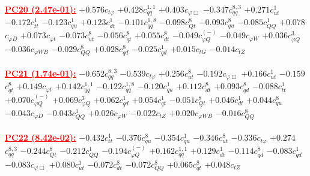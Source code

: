 \documentclass{article}
\begin{document}
\noindent \textcolor{red}{\underline{\bf{PC20} (2.47e-01):}}
{$+0.576$}{\rm $c_{t \varphi}$} 
{$+0.428$}{\rm $c_{qq}^{1,1}$} 
{$+0.403$}{\rm $c_{\varphi \Box}$} 
{$-0.347$}{\rm $c_{qq}^{8,3}$} 
{$+0.271$}{\rm $c_{ut}^{1}$} 
{$-0.172$}{\rm $c_{tt}^{1}$} 
{$-0.123$}{\rm $c_{qu}^{1}$} 
{$+0.123$}{\rm $c_{dt}^{1}$} 
{$-0.101$}{\rm $c_{qq}^{1,8}$} 
{$-0.098$}{\rm $c_{Qt}^{8}$} 
{$-0.093$}{\rm $c_{qu}^{8}$} 
{$-0.085$}{\rm $c_{QQ}^{1}$} 
{$+0.078$}{\rm $c_{\varphi D}$} 
{$+0.073$}{\rm $c_{\varphi t}$} 
{$-0.073$}{\rm $c_{ut}^{8}$} 
{$-0.056$}{\rm $c_{qt}^{8}$} 
{$+0.055$}{\rm $c_{dt}^{8}$} 
{$-0.049$}{\rm $c_{\varphi Q}^{(-)}$} 
{$-0.049$}{\rm $c_{\varphi W}$} 
{$+0.036$}{\rm $c_{\varphi Q}^{3}$} 
{$-0.036$}{\rm $c_{\varphi WB}$} 
{$-0.029$}{\rm $c_{QQ}^{8}$} 
{$+0.028$}{\rm $c_{qd}^{8}$} 
{$-0.025$}{\rm $c_{qd}^{1}$} 
{$+0.015$}{\rm $c_{tG}$} 
{$-0.014$}{\rm $c_{tZ}$} 
 \nonumber \\ \nonumber \\ 
\noindent \textcolor{red}{\underline{\bf{PC21} (1.74e-01):}}
{$-0.652$}{\rm $c_{qq}^{8,3}$} 
{$-0.539$}{\rm $c_{t \varphi}$} 
{$+0.256$}{\rm $c_{ut}^{8}$} 
{$-0.192$}{\rm $c_{\varphi \Box}$} 
{$+0.166$}{\rm $c_{ut}^{1}$} 
{$-0.159$}{\rm $c_{qt}^{8}$} 
{$+0.149$}{\rm $c_{\varphi t}$} 
{$+0.142$}{\rm $c_{qq}^{1,1}$} 
{$-0.122$}{\rm $c_{qq}^{1,8}$} 
{$-0.120$}{\rm $c_{qu}^{1}$} 
{$+0.112$}{\rm $c_{dt}^{8}$} 
{$+0.093$}{\rm $c_{qd}^{8}$} 
{$-0.088$}{\rm $c_{tt}^{1}$} 
{$+0.070$}{\rm $c_{\varphi Q}^{(-)}$} 
{$+0.069$}{\rm $c_{\varphi Q}^{3}$} 
{$+0.062$}{\rm $c_{qd}^{1}$} 
{$+0.054$}{\rm $c_{qt}^{1}$} 
{$-0.051$}{\rm $c_{Qt}^{8}$} 
{$+0.046$}{\rm $c_{dt}^{1}$} 
{$+0.044$}{\rm $c_{qu}^{8}$} 
{$-0.043$}{\rm $c_{\varphi D}$} 
{$-0.043$}{\rm $c_{QQ}^{1}$} 
{$+0.026$}{\rm $c_{\varphi W}$} 
{$-0.022$}{\rm $c_{tZ}$} 
{$+0.020$}{\rm $c_{\varphi WB}$} 
{$-0.016$}{\rm $c_{QQ}^{8}$} 
 \nonumber \\ \nonumber \\ 
\noindent \textcolor{red}{\underline{\bf{PC22} (8.42e-02):}}
{$-0.432$}{\rm $c_{tt}^{1}$} 
{$-0.376$}{\rm $c_{qu}^{8}$} 
{$-0.354$}{\rm $c_{qu}^{1}$} 
{$-0.346$}{\rm $c_{ut}^{8}$} 
{$-0.336$}{\rm $c_{t \varphi}$} 
{$+0.274$}{\rm $c_{qq}^{8,3}$} 
{$-0.244$}{\rm $c_{Qt}^{8}$} 
{$-0.212$}{\rm $c_{QQ}^{1}$} 
{$-0.194$}{\rm $c_{\varphi Q}^{(-)}$} 
{$+0.162$}{\rm $c_{qq}^{1,1}$} 
{$+0.129$}{\rm $c_{dt}^{1}$} 
{$-0.114$}{\rm $c_{qd}^{8}$} 
{$-0.083$}{\rm $c_{qd}^{1}$} 
{$-0.083$}{\rm $c_{\varphi \Box}$} 
{$+0.080$}{\rm $c_{ut}^{1}$} 
{$-0.072$}{\rm $c_{dt}^{8}$} 
{$-0.072$}{\rm $c_{QQ}^{8}$} 
{$+0.065$}{\rm $c_{qt}^{8}$} 
{$+0.048$}{\rm $c_{tZ}$} 
\end{document}
